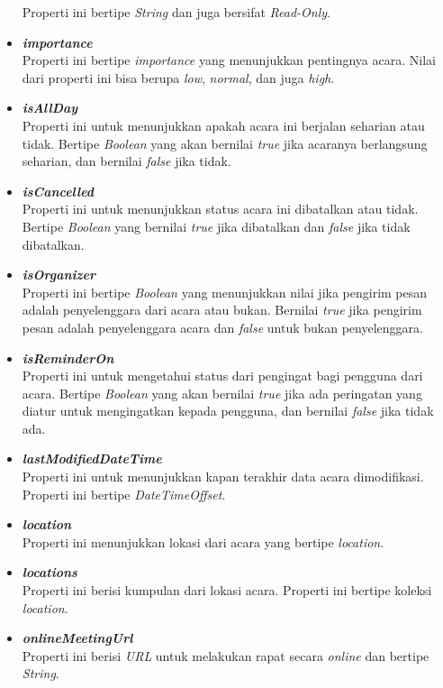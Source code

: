 \begin{itemize}
	Properti ini bertipe \textit{String} dan juga bersifat \textit{Read-Only}.
	\item \textbf{\textit{importance}}\\
	Properti ini bertipe \textit{importance} yang menunjukkan pentingnya acara. Nilai dari properti ini bisa berupa \textit{low}, \textit{normal}, dan juga \textit{high}. 
	\item \textbf{\textit{isAllDay}}\\
	Properti ini untuk menunjukkan apakah acara ini berjalan seharian atau tidak. Bertipe \textit{Boolean} yang akan bernilai \textit{true} jika acaranya berlangsung seharian, dan bernilai \textit{false} jika tidak. 
	\item \textbf{\textit{isCancelled}}\\
	Properti ini untuk menunjukkan status acara ini dibatalkan atau tidak. Bertipe \textit{Boolean} yang bernilai \textit{true} jika dibatalkan dan \textit{false} jika tidak dibatalkan. 
	\item \textbf{\textit{isOrganizer}}\\
	Properti ini bertipe \textit{Boolean} yang menunjukkan nilai jika pengirim pesan adalah penyelenggara dari acara atau bukan. Bernilai \textit{true} jika pengirim pesan adalah penyelenggara acara dan \textit{false} untuk bukan penyelenggara. 
	\item \textbf{\textit{isReminderOn}}\\
	Properti ini untuk mengetahui status dari pengingat bagi pengguna dari acara. Bertipe \textit{Boolean} yang akan bernilai \textit{true} jika ada peringatan yang diatur untuk mengingatkan kepada pengguna, dan bernilai \textit{false} jika tidak ada. 
	\item \textbf{\textit{lastModifiedDateTime}}\\
	Properti ini untuk menunjukkan kapan terakhir data acara dimodifikasi. Properti ini bertipe \textit{DateTimeOffset}. 
	\item \textbf{\textit{location}}\\
	Properti ini menunjukkan lokasi dari acara yang bertipe \textit{location}. 
	\item \textbf{\textit{locations}}\\
	Properti ini berisi kumpulan dari lokasi acara. Properti ini bertipe koleksi \textit{location}.
	\item \textbf{\textit{onlineMeetingUrl}}\\
	Properti ini berisi \textit{URL} untuk melakukan rapat secara \textit{online} dan bertipe \textit{String}. 

\end{itemize}
